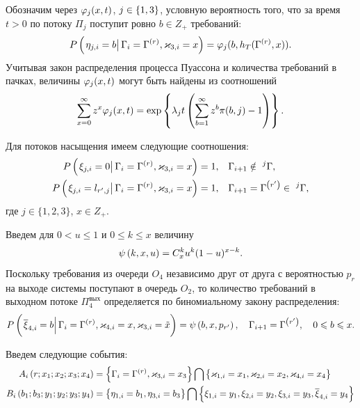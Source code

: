 \documentclass[a4paper,14pt,russian]{article}
\newcommand{\G}{\Gamma}
\renewcommand{\P}[2]{P\br{\left. #1 \right| #2}}
\newcommand{\ga}[1]{\Gamma^{\left( #1 \right)} }
\begin{document}
Обозначим через $\varphi_j(x,t)$, $j\in \left\{1,3\right\}$, условную вероятность того, что за время $t>0$ по потоку $\Pi_j$ поступит ровно $b\in Z_+$ требований:
\begin{equation}
\P{ \eta_{j,i} = b}{\G_i=\ga{r}, \vk_{3,i}=x}=\vp_j(b,h_T (\ga{r}, x)).
\end{equation}
Учитывая закон распределения процесса Пуассона и количества требований в пачках, величины $\varphi_j(x,t)$ могут быть найдены из соотношений
\begin{equation}
\sum_{x=0}^{\infty} z^x\varphi_j(x,t) = \exp\left\{\lambda_j t \left(\sum_{b=1}^{\infty} z^b \pi(b,j) -1\right)\right\}.
\end{equation}

Для потоков насыщения имеем следующие соотношения:
\begin{align}
\P{\xi_{j,i} = 0}{\G_i=\ga{r}, \vk_{3,i} = x} = 1, &\quad \G_{i+1} \notin~^j\G,\\
\P{\xi_{j,i} = l_{r',j}}{\G_i=\ga{r}, \vk_{3,i} = x} = 1, &\quad \G_{i+1}=\ga{r'}\in~^j\G,
\end{align}
где $j\in \{1, 2, 3\}$, $x \in Z_+$.

Введем для $0 < u \leqslant 1$ и $0 \leqslant k \leqslant x$ величину
\begin{equation}
\psi\left(k,x,u\right) = C_x^k u^k (1-u)^{x-k}.
\end{equation}
Поскольку требования из очереди $O_4$ независимо друг от друга с вероятностью $p_r$ на выходе системы поступают в очередь $O_2$, то количество требований в выходном потоке $\Pi_4^{\mathrm{\text{вых}}}$ определяется по биномиальному закону распределения:
\begin{equation}
\P{\overline{\xi}_{4,i} = b}{ \G_i = \ga{r}, \vk_{4,i}=x, \vk_{3,i}=\tilde{x}}=\psi\br{b,x,p_{r'}}, \quad \G_{i+1}=\ga{r'}, \quad 0 \leqslant b \leqslant x.
\end{equation}


Введем следующие события:
\begin{align}
A_i\br{r;x_1;x_2;x_3;x_4} &= \brrr{\G_i=\ga{r},\vk_{3,i}=x_3}\bigcap \brrr{\vk_{1,i}=x_1,\vk_{2,i}=x_2,\vk_{4,i}=x_4}\\
B_i\br{b_1;b_3;y_1;y_2;y_3;y_4} &= \brrr{\eta_{1,i}=b_1,\eta_{3,i}=b_3} \bigcap \brrr{\xi_{1,i}=y_1,\xi_{2,i}=y_2,\xi_{3,i}=y_3,\overline{\xi}_{4,i}=y_4}
\end{align}
\end{document}
